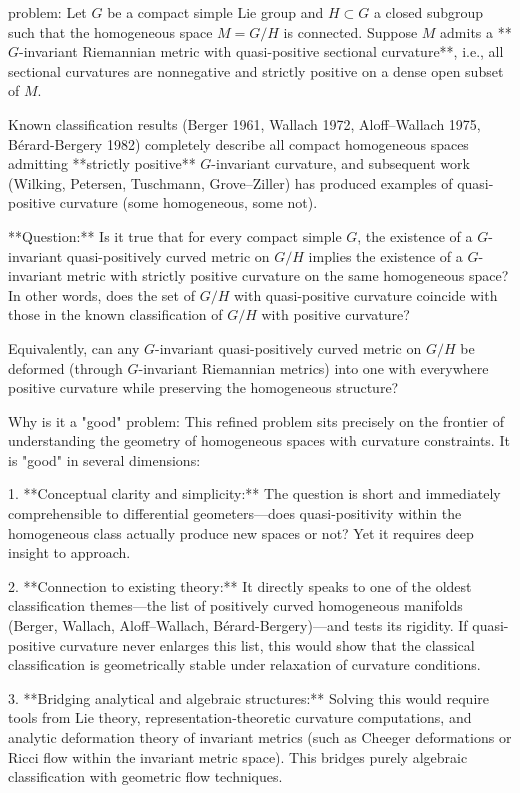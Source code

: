 problem:  
Let \( G \) be a compact simple Lie group and \( H \subset G \) a closed subgroup such that the homogeneous space \( M = G/H \) is connected. Suppose \( M \) admits a **\(G\)-invariant Riemannian metric with quasi-positive sectional curvature**, i.e., all sectional curvatures are nonnegative and strictly positive on a dense open subset of \(M\).  

Known classification results (Berger 1961, Wallach 1972, Aloff–Wallach 1975, Bérard-Bergery 1982) completely describe all compact homogeneous spaces admitting **strictly positive** \(G\)-invariant curvature, and subsequent work (Wilking, Petersen, Tuschmann, Grove–Ziller) has produced examples of quasi-positive curvature (some homogeneous, some not).  

**Question:**  
Is it true that for every compact simple \(G\), the existence of a \(G\)-invariant quasi-positively curved metric on \(G/H\) implies the existence of a \(G\)-invariant metric with strictly positive curvature on the same homogeneous space? In other words, does the set of \(G/H\) with quasi-positive curvature coincide with those in the known classification of \(G/H\) with positive curvature?

Equivalently, can any \(G\)-invariant quasi-positively curved metric on \(G/H\) be deformed (through \(G\)-invariant Riemannian metrics) into one with everywhere positive curvature while preserving the homogeneous structure?

Why is it a "good" problem:  
This refined problem sits precisely on the frontier of understanding the geometry of homogeneous spaces with curvature constraints. It is "good" in several dimensions:

1. **Conceptual clarity and simplicity:** The question is short and immediately comprehensible to differential geometers—does quasi-positivity within the homogeneous class actually produce new spaces or not? Yet it requires deep insight to approach.

2. **Connection to existing theory:** It directly speaks to one of the oldest classification themes—the list of positively curved homogeneous manifolds (Berger, Wallach, Aloff–Wallach, Bérard-Bergery)—and tests its rigidity. If quasi-positive curvature never enlarges this list, this would show that the classical classification is geometrically stable under relaxation of curvature conditions.

3. **Bridging analytical and algebraic structures:** Solving this would require tools from Lie theory, representation-theoretic curvature computations, and analytic deformation theory of invariant metrics (such as Cheeger deformations or Ricci flow within the invariant metric space). This bridges purely algebraic classification with geometric flow techniques.

